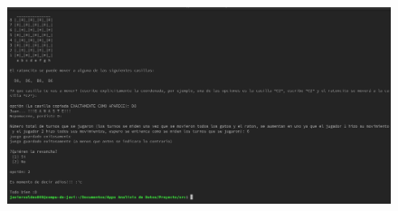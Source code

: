 \documentclass[12pt, Tahoma]{article}
\begin{document}
	\begin{figure}[H]
		\centering
		\includegraphics[scale=0.3]{Resultados12.png}
	\end{figure}
	
	
	
\end{document}
